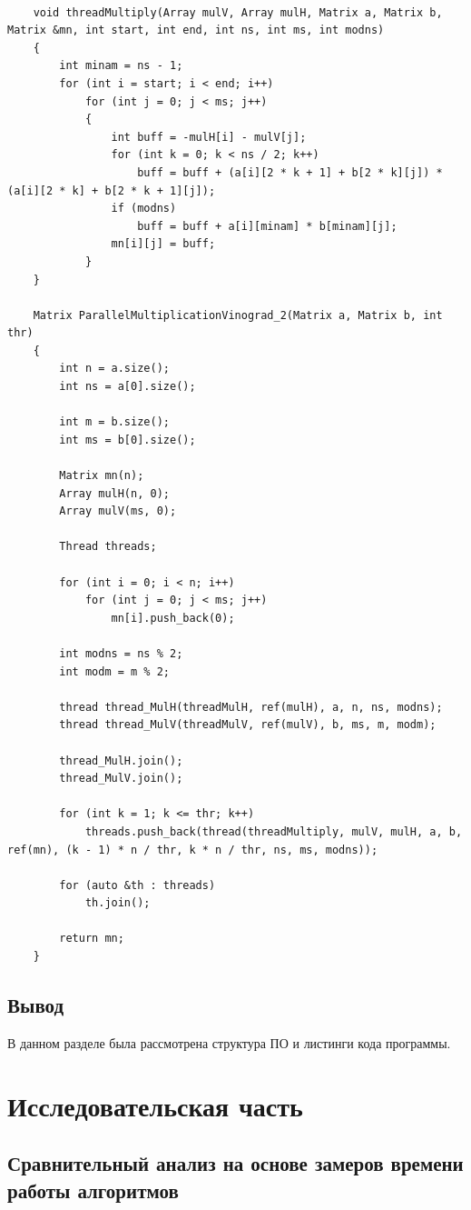 \documentclass[12pt]{report}
\begin{document}
\begin{lstlisting}[label=some-code,caption=Распараллеливание оптимизированного алгоритма Винограда]
	
	void threadMultiply(Array mulV, Array mulH, Matrix a, Matrix b, Matrix &mn, int start, int end, int ns, int ms, int modns)
	{
		int minam = ns - 1;
		for (int i = start; i < end; i++)
			for (int j = 0; j < ms; j++)
			{
				int buff = -mulH[i] - mulV[j];
				for (int k = 0; k < ns / 2; k++)
					buff = buff + (a[i][2 * k + 1] + b[2 * k][j]) * (a[i][2 * k] + b[2 * k + 1][j]);
				if (modns)
					buff = buff + a[i][minam] * b[minam][j];
				mn[i][j] = buff;
			}
	}
	
	Matrix ParallelMultiplicationVinograd_2(Matrix a, Matrix b, int thr)
	{
		int n = a.size();
		int ns = a[0].size();
		
		int m = b.size();
		int ms = b[0].size();
		
		Matrix mn(n);
		Array mulH(n, 0);
		Array mulV(ms, 0);
		
		Thread threads;
		
		for (int i = 0; i < n; i++)
			for (int j = 0; j < ms; j++)
				mn[i].push_back(0);
		
		int modns = ns % 2;
		int modm = m % 2;
		
		thread thread_MulH(threadMulH, ref(mulH), a, n, ns, modns);
		thread thread_MulV(threadMulV, ref(mulV), b, ms, m, modm);
		
		thread_MulH.join();
		thread_MulV.join();
		
		for (int k = 1; k <= thr; k++)
			threads.push_back(thread(threadMultiply, mulV, mulH, a, b, ref(mn), (k - 1) * n / thr, k * n / thr, ns, ms, modns));
		
		for (auto &th : threads)
			th.join();
		
		return mn;
	}
\end{lstlisting}

\section{Вывод}
В данном разделе была рассмотрена структура ПО и листинги кода программы.


\chapter{Исследовательская часть}

\section{Сравнительный анализ на основе замеров времени работы алгоритмов}
\end{document}
